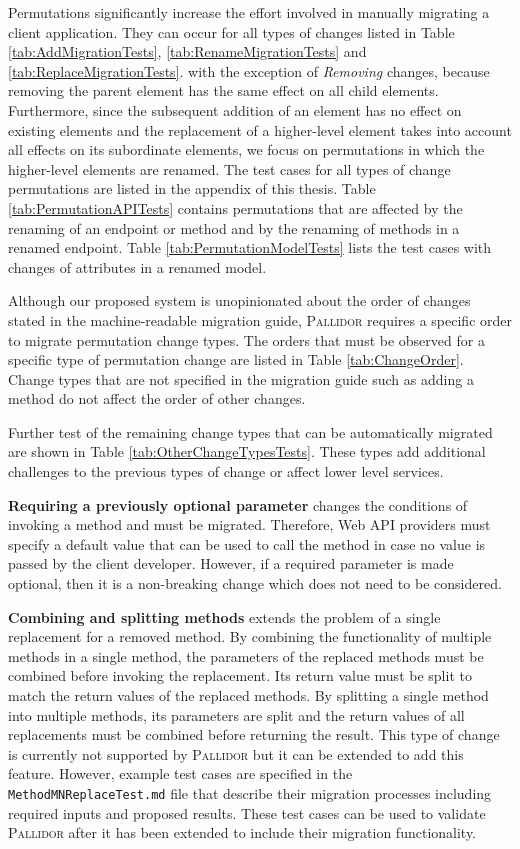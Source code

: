 Permutations significantly increase the effort involved in manually migrating a client application. They can occur for all types of changes listed in Table \ref{tab:AddMigrationTests}, \ref{tab:RenameMigrationTests} and \ref{tab:ReplaceMigrationTests}. with the exception of \textit{Re\-mo\-ving} changes, because removing the parent element has the same effect on all child elements. Furthermore, since the subsequent addition of an element has no effect on existing elements and the replacement of a higher-level element takes into account all effects on its subordinate elements, we focus on permutations in which the higher-level elements are renamed. The test cases for all types of change permutations are listed in the appendix of this thesis. Table \ref{tab:PermutationAPITests} contains permutations that are affected by the renaming of an endpoint or method and by the renaming of methods in a renamed endpoint. Table \ref{tab:PermutationModelTests} lists the test cases with changes of attributes in a renamed model.

Although our proposed system is unopinionated about the order of changes stated in the machine-readable migration guide, \textsc{Pallidor} requires a specific order to migrate permutation change types. The orders that must be observed for a specific type of permutation change are listed in Table \ref{tab:ChangeOrder}. Change types that are not specified in the migration guide such as adding a method do not affect the order of other changes.

Further test of the remaining change types that can be automatically migrated are shown in Table \ref{tab:OtherChangeTypesTests}. These types add additional challenges to the previous types of change or affect lower level services. 

\textbf{Requiring a previously optional parameter} changes the conditions of invoking a method and must be migrated. Therefore, Web API providers must specify a default value that can be used to call the method in case no value is passed by the client developer. However, if a required parameter is made optional, then it is a non-breaking change which does not need to be considered.

\textbf{Combining and splitting methods} extends the problem of a single replacement for a removed method. By combining the functionality of multiple methods in a single method, the parameters of the replaced methods must be combined before invoking the replacement. Its return value must be split to match the return values of the replaced methods. By splitting a single method into multiple methods, its parameters are split and the return values of all replacements must be combined before returning the result. This type of change is currently not supported by \textsc{Pallidor} but it can be extended to add this feature. However, example test cases are specified in the \texttt{MethodMNReplaceTest.md} file that describe their migration processes including required inputs and proposed results. These test cases can be used to validate \textsc{Pallidor} after it has been extended to include their migration functionality. 

